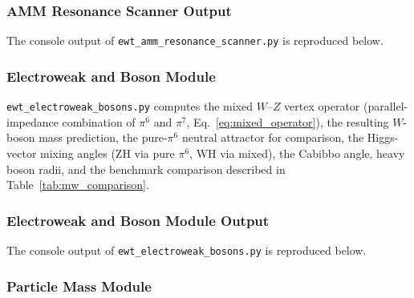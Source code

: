 \documentclass[10pt,a4paper]{article}
\begin{document}


\subsubsection{AMM Resonance Scanner Output}
\label{app:ewt_amm_resonance_scanner_output}

The console output of \texttt{ewt\_amm\_resonance\_scanner.py} is reproduced below.



\subsubsection{Electroweak and Boson Module}
\label{app:ewt_electroweak_bosons}

\texttt{ewt\_electroweak\_bosons.py} computes the mixed $W$--$Z$
vertex operator (parallel-impedance combination of $\pi^6$ and $\pi^7$,
Eq.~\ref{eq:mixed_operator}), the resulting $W$-boson mass prediction,
the pure-$\pi^6$ neutral attractor for comparison, the Higgs-vector
mixing angles (ZH via pure $\pi^6$, WH via mixed), the Cabibbo angle,
heavy boson radii, and the benchmark comparison described in
Table~\ref{tab:mw_comparison}.


\subsubsection{Electroweak and Boson Module Output}
\label{app:ewt_electroweak_bosons_output}

The console output of \texttt{ewt\_electroweak\_bosons.py} is reproduced below.



\subsubsection{Particle Mass Module}
\label{app:ewt_particle_masses}
\end{document}
